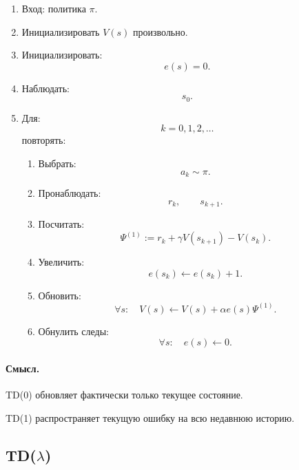 \documentclass[12pt,a4paper]{article}
\begin{document}
\begin{enumerate}
    \item Вход: политика $\pi$.

    \item Инициализировать $V(s)$ произвольно.

    \item Инициализировать:
    \[
    e(s)=0.
    \]

    \item Наблюдать:
    \[
    s_0.
    \]

    \item Для:
    \[
    k=0,1,2,\ldots
    \]
    повторять:
    \begin{enumerate}
        \item Выбрать:
        \[
        a_k\sim\pi.
        \]

        \item Пронаблюдать:
        \[
        r_k,
        \qquad
        s_{k+1}.
        \]

        \item Посчитать:
        \[
        \Psi^{(1)}
        :=
        r_k+\gamma V(s_{k+1})-V(s_k).
        \]

        \item Увеличить:
        \[
        e(s_k)
        \leftarrow
        e(s_k)+1.
        \]

        \item Обновить:
        \[
        \forall s:
        \quad
        V(s)
        \leftarrow
        V(s)
        +
        \alpha e(s)\Psi^{(1)}.
        \]

        \item Обнулить следы:
        \[
        \forall s:
        \quad
        e(s)
        \leftarrow
        0.
        \]
    \end{enumerate}
\end{enumerate}

\paragraph{Смысл.}

TD(0) обновляет фактически только текущее состояние.

TD(1) распространяет текущую ошибку на всю недавнюю историю.

\subsection{TD($\lambda$)}
\end{document}
